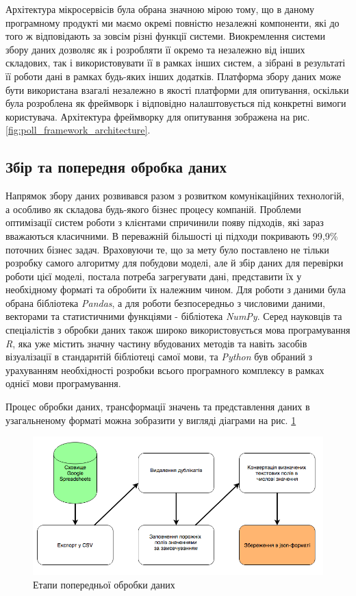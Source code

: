 Архітектура мікросервісів була обрана значною мірою тому, що в даному програмному продукті ми маємо окремі повністю незалежні компоненти, які до того ж відповідають за зовсім різні функції системи. Виокремлення системи збору даних дозволяє як і розробляти її окремо та незалежно від інших складових, так і використовувати її в рамках інших систем, а зібрані в результаті її роботи дані в рамках будь-яких інших додатків. Платформа збору даних може бути використана взагалі незалежно в якості платформи для опитування, оскільки була розроблена як фреймворк і відповідно налаштовується під конкретні вимоги користувача. Архітектура фреймворку для опитування зображена на рис. \ref{fig:poll_framework_architecture}.

\subsection{Збір та попередня обробка даних}
Напрямок збору даних розвивався разом з розвитком комунікаційних технологій, а особливо як складова будь-якого бізнес процесу компаній. Проблеми оптимізації систем роботи з клієнтами спричинили появу підходів, які зараз вважаються класичними. В переважній більшості ці підходи покривають 99,9\% поточних бізнес задач. Враховуючи те, що за мету було поставлено не тільки розробку самого алгоритму для побудови моделі, але й збір даних для перевірки роботи цієї моделі, постала потреба загрегувати дані, представити їх у необхідному форматі та обробити їх належним чином. Для роботи з даними була обрана бібліотека \textit{Pandas}, а для роботи безпосередньо з числовими даними, векторами та статистичними функціями - бібліотека \textit{NumPy}. Серед науковців та спеціалістів з обробки даних також широко використовується мова програмування \textit{R}, яка уже містить значну частину вбудованих методів та навіть засобів візуалізації в стандарнтій бібліотеці самої мови, та \textit{Python} був обраний з урахуванням необхідності розробки всього програмного комплексу в рамках однієї мови програмування.

Процес обробки даних, трансформації значень та представлення даних в узагальненому форматі можна зобразити у вигляді діаграми на рис. \ref{fig:data_processing}

\begin{figure}[h!]
  \includegraphics[width=\linewidth]{figures/data_processing.png}
  \caption{Етапи попередньої обробки даних}
  \label{fig:data_processing}
\end{figure}

